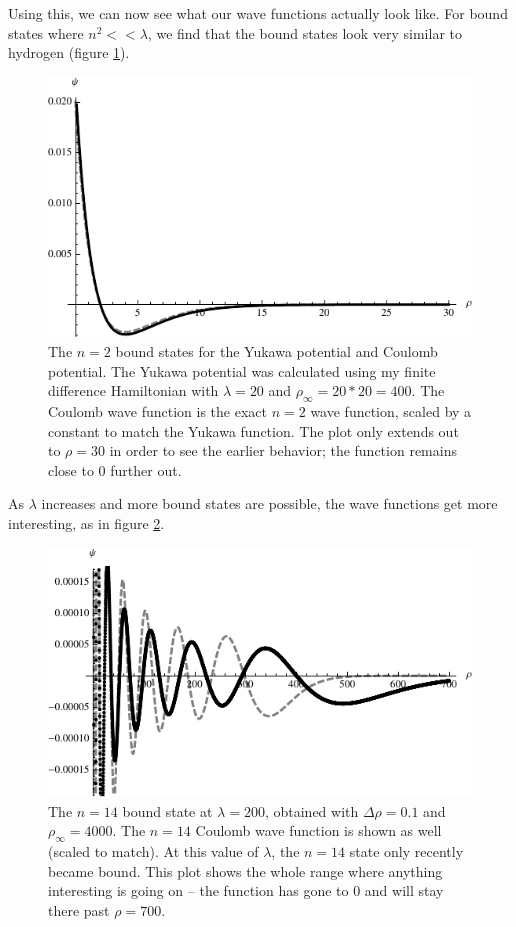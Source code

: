 \documentclass[12pt,twoside]{reedthesis}
\begin{document}
Using this, we can now see what our wave functions actually look like. For bound states where $n^2 << \lambda$, we find that the bound states look very similar to hydrogen (figure \ref{fig:hyd-yukawa}).
\begin{figure}[h]
\centering
\includegraphics{Figures/n2hydyukawa}
\caption[The $n = 2$ bound states for the Yukawa potential and Coulomb potential]{The $n = 2$ bound states for the Yukawa potential and Coulomb potential. The Yukawa potential was calculated using my finite difference Hamiltonian with $\lambda = 20$ and  $\rho_{\infty} = 20*20 = 400$. The Coulomb wave function is the exact $n=2$ wave function, scaled by a constant to match the Yukawa function. The plot only extends out to $\rho = 30$ in order to see the earlier behavior; the function remains close to 0 further out.}
\label{fig:hyd-yukawa}
\end{figure}
As $\lambda$ increases and more bound states are possible, the wave functions get more interesting, as in figure \ref{fig:largebound}.
\begin{figure}[h!]
\centering
\includegraphics{Figures/largebound}
\caption[The $n=14$ bound state at $\lambda = 200$]{The $n=14$ bound state at $\lambda = 200$, obtained with $\Delta \rho = 0.1$ and $\rho_{\infty} = 4000$. The $n=14$ Coulomb wave function is shown as well (scaled to match). At this value of $\lambda$, the $n=14$ state only recently became bound. This plot shows the whole range where anything interesting is going on -- the function has gone to 0 and will stay there past $\rho = 700$.}
\label{fig:largebound}
\end{figure}
\end{document}

